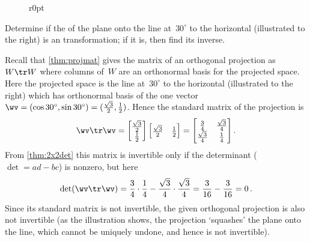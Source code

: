 \begin{wrapfigure}[5]r{0pt}
\end{wrapfigure}
\begin{example} 
Determine if the  of the plane onto the line at~\(30^\circ\) to the horizontal (illustrated to the right) is an  transformation; if it is, then find its inverse.

\begin{solution} 
Recall that \cref{thm:projmat} gives the matrix of an orthogonal projection as~\(W\tr W\) where columns of~\(W\) are an orthonormal basis for the projected space.
Here the projected space is the line at~\(30^\circ\) to the horizontal (illustrated to the right) which has orthonormal basis of the one vector \(\wv=(\cos 30^\circ,\sin 30^\circ)=(\tfrac{\sqrt3}2,\tfrac12)\).
Hence the standard matrix of the projection is
\begin{equation*}
\wv\tr\wv=\begin{bmatrix} \tfrac{\sqrt3}2\\\tfrac12 \end{bmatrix}
\begin{bmatrix} \tfrac{\sqrt3}2&\tfrac12 \end{bmatrix}
=\begin{bmatrix} \tfrac34&\tfrac{\sqrt3}4\\
\tfrac{\sqrt3}4&\tfrac14 \end{bmatrix}.
\end{equation*}
From \cref{thm:2x2det} this matrix is invertible only if the determinant (\(\det=ad-bc\)) is nonzero, but here
\begin{equation*}
\det(\wv\tr\wv)=\frac34\cdot\frac14-\frac{\sqrt3}4\cdot\frac{\sqrt3}4
=\frac3{16}-\frac3{16}=0\,.
\end{equation*}
Since its standard matrix is not invertible, the given orthogonal projection is also not invertible (as the illustration shows, the projection `squashes' the plane onto the line, which cannot be uniquely undone, and hence is not invertible).
\end{solution}
\end{example}







%




